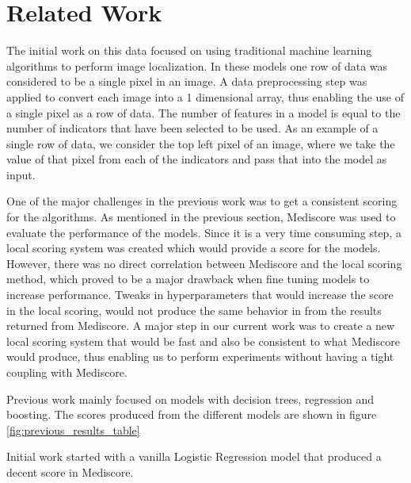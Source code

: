 \section{Related Work}

The initial work on this data focused on using traditional machine learning algorithms to perform image localization. In these models one 
row of data was considered to be a single pixel in an image. A data preprocessing step was applied to convert each image into a 1 dimensional
array, thus enabling the use of a single pixel as a row of data. The number of features in a model is equal to the number of indicators 
that have been selected to be used. As an example of a single row of data, we consider the top left pixel of an image, where we take the 
value of that pixel from each of the indicators and pass that into the model as input.

One of the major challenges in the previous work was to get a consistent scoring for the algorithms. As mentioned in the previous section, 
Mediscore was used to evaluate the performance of the models. Since it is a very time consuming step, a local scoring system was created which 
would provide a score for the models. However, there was no direct correlation between Mediscore and the local scoring method, which proved 
to be a major drawback when fine tuning models to increase performance. Tweaks in hyperparameters that would increase the score in the 
local scoring, would not produce the same behavior in from the results returned from Mediscore. A major step in our current work was to 
create a new local scoring system that would be fast and also be consistent to what Mediscore would produce, thus enabling us to perform 
experiments without having a tight coupling with Mediscore.

Previous work mainly focused on models with decision trees, regression and boosting. The scores produced from the different models are shown in 
figure \ref{fig:previous_results_table}

Initial work started with a vanilla Logistic Regression model that produced a decent score in Mediscore.  


